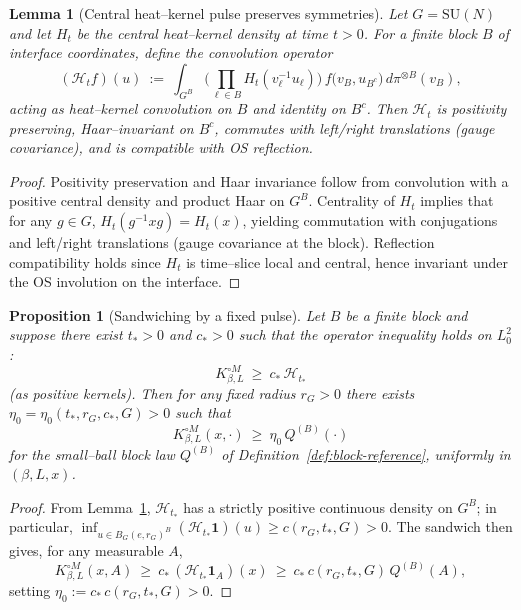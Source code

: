 \documentclass[11pt]{amsart}
\theoremstyle{plain}
\newtheorem{lemma}[theorem]{Lemma}
\newtheorem{proposition}[theorem]{Proposition}
\theoremstyle{definition}
\theoremstyle{remark}
\begin{document}
\begin{lemma}[Central heat--kernel pulse preserves symmetries]\label{lem:central-pulse}
Let $G=\mathrm{SU}(N)$ and let $H_t$ be the central heat--kernel density at time $t>0$. For a finite block $B$ of interface coordinates, define the convolution operator
\[
  (\mathcal H_t f)(u)\ :=\ \int_{G^{B}} \Big(\prod_{\ell\in B} H_t(v_\ell^{-1}u_\ell)\Big)\, f\big( v_B, u_{B^c}\big)\, d\pi^{\otimes B}(v_B),
\]
acting as heat--kernel convolution on $B$ and identity on $B^c$. Then $\mathcal H_t$ is positivity preserving, Haar--invariant on $B^c$, commutes with left/right translations (gauge covariance), and is compatible with OS reflection.
\end{lemma}
\begin{proof}
Positivity preservation and Haar invariance follow from convolution with a positive central density and product Haar on $G^{B}$. Centrality of $H_t$ implies that for any $g\in G$, $H_t(g^{-1}xg)=H_t(x)$, yielding commutation with conjugations and left/right translations (gauge covariance at the block). Reflection compatibility holds since $H_t$ is time--slice local and central, hence invariant under the OS involution on the interface.
\end{proof}

\begin{proposition}[Sandwiching by a fixed pulse]\label{prop:sandwich-pulse}
Let $B$ be a finite block and suppose there exist $t_*>0$ and $c_*>0$ such that the operator inequality holds on $L^2_0$:
\[
  K_{\beta,L}^{\circ M}\ \ge\ c_*\, \mathcal H_{t_*}
\]
(as positive kernels). Then for any fixed radius $r_G>0$ there exists $\eta_0=\eta_0(t_*,r_G,c_*,G)>0$ such that
\[
  K_{\beta,L}^{\circ M}(x,\cdot)\ \ge\ \eta_0\, Q^{(B)}(\cdot)
\]
for the small--ball block law $Q^{(B)}$ of Definition~\ref{def:block-reference}, uniformly in $(\beta,L,x)$.
\end{proposition}
\begin{proof}
From Lemma~\ref{lem:central-pulse}, $\mathcal H_{t_*}$ has a strictly positive continuous density on $G^{B}$; in particular, $\inf_{u\in B_G(e,r_G)^{B}} (\mathcal H_{t_*}\mathbf 1)(u)\ge c(r_G,t_*,G)>0$. The sandwich then gives, for any measurable $A$,
\[
  K_{\beta,L}^{\circ M}(x,A)\ \ge\ c_*\, (\mathcal H_{t_*}\mathbf 1_{A})(x)\ \ge\ c_*\, c(r_G,t_*,G)\, Q^{(B)}(A),
\]
setting $\eta_0:=c_*\, c(r_G,t_*,G)>0$.
\end{proof}
\end{document}

